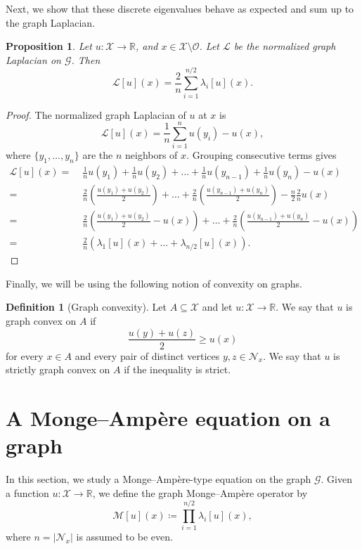 \documentclass[reqno,11pt]{amsart}
\numberwithin{equation}{section}
\newtheorem{proposition}[theorem]{Proposition}
\theoremstyle{definition}
\newtheorem{definition}[theorem]{Definition}
\theoremstyle{remark}
\begin{document}
Next, we show that these discrete eigenvalues behave as expected and sum up to the graph Laplacian.

\begin{proposition}
Let $u \colon \mathcal{X}\rightarrow\mathbb{R}$, and \(x\in\mathcal X\setminus\mathcal O\). Let $\mathcal{L}$ be the normalized graph Laplacian on $\mathcal{G}$. Then   
\[
    \mathcal{L}[u](x) = \frac{2}{n} \sum_{i=1}^{n/2}\lambda_i[u](x).
\]
\end{proposition}

\begin{proof}
The normalized graph Laplacian of \(u\) at \(x\) is
$$\mathcal{L}[u](x)=\frac{1}{n} \sum_{i=1}^n u(y_i)-u(x),$$
where $\{y_1,\dots,y_n\}$ are the $n$ neighbors of $x$. Grouping consecutive terms gives
$$\begin{aligned}
    \mathcal{L}[u](x)=&\;\frac{1}{n}u(y_1)+\frac{1}{n}u(y_2)+\dots +\frac{1}{n}u(y_{n-1})+\frac{1}{n}u(y_n)-u(x)\\
    =&\; \frac{2}{n}\left(\frac{u(y_1)+u(y_2)}{2}\right)+\dots +\frac{2}{n}\left(\frac{u(y_{n-1})+u(y_n)}{2}\right)-\frac{n}{2}\frac{2}{n}u(x)\\
    =&\; \frac{2}{n}\left(\frac{u(y_1)+u(y_2)}{2}-u(x)\right)+\dots +\frac{2}{n}\left(\frac{u(y_{n-1})+u(y_n)}{2}-u(x)\right)\\
    =&\;\frac{2}{n}\left(\lambda_1[u](x)+\dots+\lambda_{n/2}[u](x)\right).
\end{aligned}$$
\end{proof}

Finally, we will be using the following notion of convexity on graphs.

\begin{definition}[Graph convexity]
Let $A\subseteq\mathcal X$ and let $u\colon\mathcal X\to\mathbb R$. We say that $u$ is graph convex on $A$ if
\[
    \frac{u(y)+u(z)}{2}\ge u(x)
\]
for every $x\in A$ and every pair of distinct vertices $y,z\in\mathcal N_x$. We say that $u$ is strictly graph convex on $A$ if the inequality is strict.
\end{definition}

\section{A Monge--Amp\`ere equation on a graph}

In this section, we study a Monge--Amp\`ere-type equation on the graph $\mathcal G$.  Given a function $u\colon \mathcal X\to \mathbb R$, we define the graph Monge--Amp\`ere operator by
\[
    \mathcal M [u](x)
    \coloneqq
\prod_{i=1}^{n/2}\lambda_i[u](x),
\]
where $n=|\mathcal N_x|$ is assumed to be even.  
\end{document}
